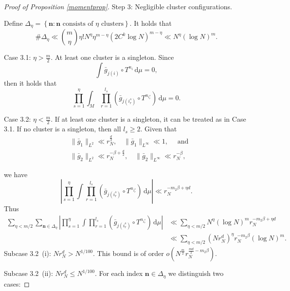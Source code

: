 \documentclass[11pt,twoside,a4paper,reqno]{amsart}
\renewcommand{\d}{\, \text{d}}
\begin{document}
\begin{proof}[Proof of Proposition \ref{momentprop}]
Step 3: Negligible cluster configurations.

Define $\Delta_\eta = \left\{\mathbf{n} : \mathbf{n} \text{ consists of } \eta \text{ clusters}\right\}.$
It holds that
\begin{equation}\label{clusternumber}
\#\Delta_{\eta} \ll \binom{m}{\eta}\eta !N^{\eta}\eta^{m-\eta} \left(2C^k\log N\right)^{m-\eta}\ll N^{\eta} (\log N)^{m}.
\end{equation}



Case 3.1: $\eta>\frac{m}{2}.$ At least one cluster is a singleton.
Since
$$\int\bar{g}_{j(i)} \circ T^{n_i} \d\mu = 0,$$
then it holds that
\begin{equation*}
\prod_{s=1}^{\eta} \int_M \prod_{r=1}^{l_s} (\bar{g}_{j(i^s_r)} \circ T^{n_{i^s_r}}) \d\mu=0.
\end{equation*}

Case 3.2: $\eta<\frac{m}{2}.$ If at least one cluster is a singleton, it can be treated as in Case 3.1.
If no cluster is a singleton, then all $l_s \geq 2$. Given that
\begin{align*}
&\|\bar{g}_1\|_{L^2} \ll r_N^{\frac{d}{2}},\quad \|\bar{g}_1\|_{L^{\infty}} \ll 1, \quad \text{ and}\\
&\|\bar{g}_2\|_{L^2} \ll r_N^{-\beta+\frac{d}{2}},\quad \|\bar{g}_2\|_{L^{\infty}} \ll r_N^{-\beta},
\end{align*}




we have
\begin{equation}\label{clusterint}
\left|\prod_{s=1}^{\eta}\int\prod_{r=1}^{l_s}(\bar{g}_{j(i^s_r)} \circ T^{n_{i^s_r}})\d\mu\right|\ll
r_N^{-m_2 \beta + \eta d}.
\end{equation}
Thus
\begin{equation*}
\begin{aligned}
\sum_{\eta<m/2} \sum_{\mathbf{n} \in \Delta_\eta}
\left|\prod_{s=1}^{\eta}\int\prod_{r=1}^{l_s}(\bar{g}_{j(i^s_r)} \circ T^{n_{i^s_r}})\d\mu\right|
&\ll\sum_{\eta<m/2}N^{\eta} (\log N)^m r_N^{-m_2 \beta + \eta d}\\
&\ll\sum_{\eta<m/2} \left(N r_N^d\right)^\eta r_N^{- m_2 \beta}(\log N)^m.
\end{aligned}
\end{equation*}
Subcase 3.2~(i): $N r_N^d>N^{1/100}$. This bound is of order $o\left(N^{\frac{m}{2}} r_N^{\frac{md}{2} - m_2 \beta}\right).$

Subcase 3.2~(ii): $N r_N^d\leq N^{1/100}$. For each index $\textbf{n}\in \Delta_{\eta}$ we distinguish two cases:


\end{proof}
\end{document}
